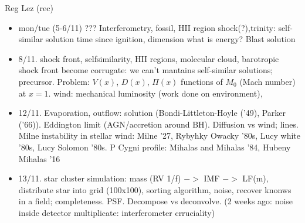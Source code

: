\begin{frame}[allowframebreaks]{Reg Lez (rec)}
\begin{itemize}
\item mon/tue (5-6/11) ???
Interferometry, fossil, HII region shock(?),trinity: self-similar solution time since ignition, dimension what is energy?
Blast solution

\item 8/11. shock front, selfsimilarity, HII regions, molecular cloud, barotropic shock front become corrugate: we can't mantains self-similar solutions; precursor. Problem: $V(x)$, $D(x)$, $\Pi(x)$ functions of $M_0$ (Mach number) at $x=1$.
wind: mechanical luminosity (work done on environment),

\item 12/11. Evaporation, outflow: solution (Bondi-Littleton-Hoyle ('49), Parker ('66)). Eddington limit (AGN/accretion around BH). Diffusion vs wind; lines. Milne instability in stellar wind: Milne '27, Rybyhky Owacky '80s, Lucy white '80s, Lucy Solomon '80s. P Cygni profile: Mihalas and Mihalas '84, Hubeny Mihalas '16

\item 13/11. star cluster simulation: mass (RV 1/f) $->$ IMF $->$ LF(m), distribute star into grid (100x100), sorting algorithm, noise, recover knonws in a field; completeness. PSF. Decompose vs deconvolve. (2 weeks ago: noise inside detector multiplicate: interferometer crruciality)
\end{itemize}

\end{frame}